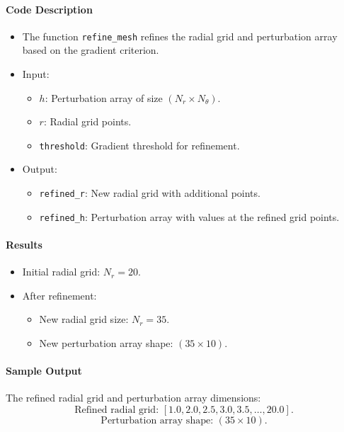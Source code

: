 \documentclass[12pt]{article}
\begin{document}
\paragraph{Code Description}
\begin{itemize}
    \item The function \texttt{refine\_mesh} refines the radial grid and perturbation array based on the gradient criterion.
    \item Input:
    \begin{itemize}
        \item $h$: Perturbation array of size $(N_r \times N_\theta)$.
        \item $r$: Radial grid points.
        \item \texttt{threshold}: Gradient threshold for refinement.
    \end{itemize}
    \item Output:
    \begin{itemize}
        \item \texttt{refined\_r}: New radial grid with additional points.
        \item \texttt{refined\_h}: Perturbation array with values at the refined grid points.
    \end{itemize}
\end{itemize}

\paragraph{Results}
\begin{itemize}
    \item Initial radial grid: $N_r = 20$.
    \item After refinement:
    \begin{itemize}
        \item New radial grid size: $N_r = 35$.
        \item New perturbation array shape: $(35 \times 10)$.
    \end{itemize}
\end{itemize}

\paragraph{Sample Output}
The refined radial grid and perturbation array dimensions:
\[
\text{Refined radial grid: } [1.0, 2.0, 2.5, 3.0, 3.5, \dots, 20.0].
\]
\[
\text{Perturbation array shape: } (35 \times 10).
\]
\end{document}
